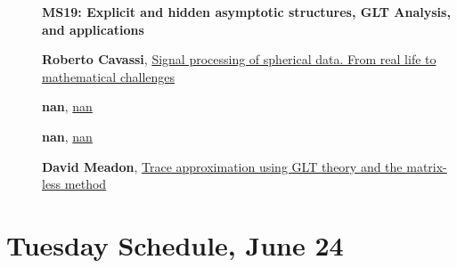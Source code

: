 \documentclass[ILAS2025-program.tex]{subfiles}
\begin{document}
    \begin{description}
    \item[] {\color{mstitle}\textbf{MS19: Explicit and hidden asymptotic structures, GLT Analysis, and applications}} 
    \item[] \hypertarget{up0217}{}\textbf{Roberto Cavassi}, \hyperlink{down0217}{Signal processing of spherical data. From real life to mathematical challenges}
        \item[] \hypertarget{up0218}{}\textbf{nan}, \hyperlink{down0218}{nan}
        \item[] \hypertarget{up0219}{}\textbf{nan}, \hyperlink{down0219}{nan}
        \item[] \hypertarget{up0220}{}\textbf{David Meadon}, \hyperlink{down0220}{Trace approximation using GLT theory and the matrix-less method
}
        \end{description}
    \newpage

\section*{Tuesday Schedule, June 24 }
        
\end{document}
